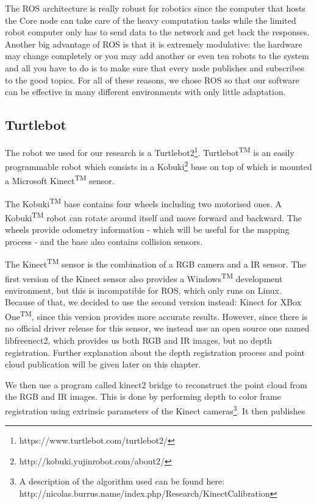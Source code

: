 The ROS architecture is really robust for robotics since the computer that hosts the Core node can take care of the heavy computation tasks while the limited robot computer only has to send data to the network and get back the responses. Another big advantage of ROS is that it is extremely modulative: the hardware may change completely or you may add another or even ten robots to the system and all you have to do is to make sure that every node publishes and subscribes to the good topics. For all of these reasons, we chose ROS so that our software can be effective in many different environments with only little adaptation.

\subsection{Turtlebot}
The robot we used for our research is a Turtlebot2\footnote{https://www.turtlebot.com/turtlebot2/}. Turtlebot\textsuperscript{TM} is an easily programmable robot which consists in a Kobuki\footnote{http://kobuki.yujinrobot.com/about2/} base on top of which is mounted a Microsoft Kinect\textsuperscript{TM} sensor. 

The Kobuki\textsuperscript{TM} base contains four wheels including two motorised ones. A Kobuki\textsuperscript{TM} robot can rotate around itself and move forward and backward. The wheels provide odometry information - which will be useful for the mapping process - and the base also contains collision sensors.

The Kinect\textsuperscript{TM} sensor is the combination of a RGB camera and a IR sensor. The first version of the Kinect sensor also provides a Windows\textsuperscript{TM} development environment, but this is incompatible for ROS, which only runs on Linux. Because of that, we decided to use the second version instead: Kinect for XBox One\textsuperscript{TM}, since this version provides more accurate results\cite{kinect_comparison}. However, since there is no official driver release for this sensor, we instead use an open source one named libfreenect2\cite{libfreenect2}, which provides us both RGB and IR images, but no depth registration. Further explanation about the depth registration process and point cloud publication will be given later on this chapter.

We then use a program called kinect2 bridge\cite{iai_kinect2} to reconstruct the point cloud from the RGB and IR images. This is done by performing depth to color frame registration using extrinsic parameters of the Kinect cameras\footnote{\raggedright A description of the algorithm used can be found here: http://nicolas.burrus.name/index.php/Research/KinectCalibration}.
It then publishes 

